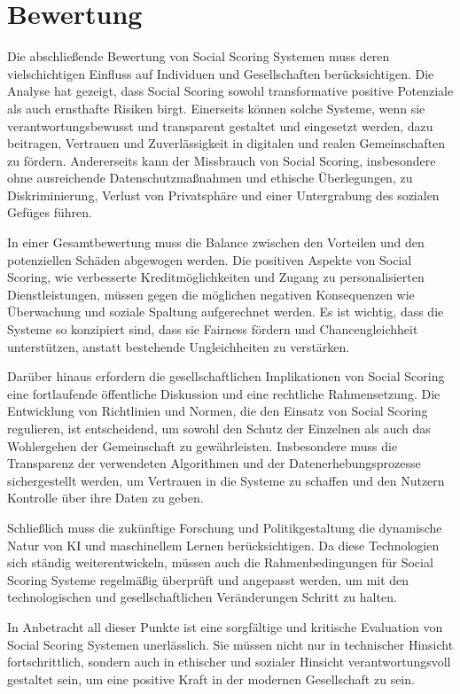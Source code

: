 \chapter{Bewertung}

Die abschließende Bewertung von Social Scoring Systemen muss deren vielschichtigen Einfluss auf Individuen und Gesellschaften berücksichtigen. Die Analyse hat gezeigt, dass Social Scoring sowohl transformative positive Potenziale als auch ernsthafte Risiken birgt. Einerseits können solche Systeme, wenn sie verantwortungsbewusst und transparent gestaltet und eingesetzt werden, dazu beitragen, Vertrauen und Zuverlässigkeit in digitalen und realen Gemeinschaften zu fördern. Andererseits kann der Missbrauch von Social Scoring, insbesondere ohne ausreichende Datenschutzmaßnahmen und ethische Überlegungen, zu Diskriminierung, Verlust von Privatsphäre und einer Untergrabung des sozialen Gefüges führen.

In einer Gesamtbewertung muss die Balance zwischen den Vorteilen und den potenziellen Schäden abgewogen werden. Die positiven Aspekte von Social Scoring, wie verbesserte Kreditmöglichkeiten und Zugang zu personalisierten Dienstleistungen, müssen gegen die möglichen negativen Konsequenzen wie Überwachung und soziale Spaltung aufgerechnet werden. Es ist wichtig, dass die Systeme so konzipiert sind, dass sie Fairness fördern und Chancengleichheit unterstützen, anstatt bestehende Ungleichheiten zu verstärken.

Darüber hinaus erfordern die gesellschaftlichen Implikationen von Social Scoring eine fortlaufende öffentliche Diskussion und eine rechtliche Rahmensetzung. Die Entwicklung von Richtlinien und Normen, die den Einsatz von Social Scoring regulieren, ist entscheidend, um sowohl den Schutz der Einzelnen als auch das Wohlergehen der Gemeinschaft zu gewährleisten. Insbesondere muss die Transparenz der verwendeten Algorithmen und der Datenerhebungsprozesse sichergestellt werden, um Vertrauen in die Systeme zu schaffen und den Nutzern Kontrolle über ihre Daten zu geben.

Schließlich muss die zukünftige Forschung und Politikgestaltung die dynamische Natur von KI und maschinellem Lernen berücksichtigen. Da diese Technologien sich ständig weiterentwickeln, müssen auch die Rahmenbedingungen für Social Scoring Systeme regelmäßig überprüft und angepasst werden, um mit den technologischen und gesellschaftlichen Veränderungen Schritt zu halten.

In Anbetracht all dieser Punkte ist eine sorgfältige und kritische Evaluation von Social Scoring Systemen unerlässlich. Sie müssen nicht nur in technischer Hinsicht fortschrittlich, sondern auch in ethischer und sozialer Hinsicht verantwortungsvoll gestaltet sein, um eine positive Kraft in der modernen Gesellschaft zu sein.